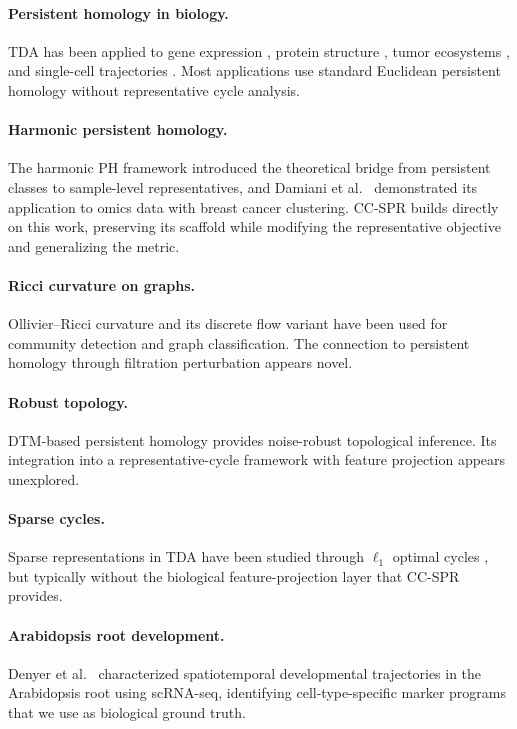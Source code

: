 \documentclass[11pt]{article}
\begin{document}
\paragraph{Persistent homology in biology.}
TDA has been applied to gene expression \cite{rizvi2017}, protein structure \cite{xia2014}, tumor ecosystems \cite{vipond2021}, and single-cell trajectories \cite{moon2019phate}.
Most applications use standard Euclidean persistent homology without representative cycle analysis.

\paragraph{Harmonic persistent homology.}
The harmonic PH framework \cite{harmonicPH} introduced the theoretical bridge from persistent classes to sample-level representatives, and Damiani et al.\ \cite{damiani2024} demonstrated its application to omics data with breast cancer clustering.
CC-SPR builds directly on this work, preserving its scaffold while modifying the representative objective and generalizing the metric.

\paragraph{Ricci curvature on graphs.}
Ollivier--Ricci curvature \cite{ollivier2007, ollivier2009} and its discrete flow variant \cite{ni2019community} have been used for community detection and graph classification.
The connection to persistent homology through filtration perturbation appears novel.

\paragraph{Robust topology.}
DTM-based persistent homology \cite{chazal2011dtm, chazal2017robust} provides noise-robust topological inference.
Its integration into a representative-cycle framework with feature projection appears unexplored.

\paragraph{Sparse cycles.}
Sparse representations in TDA have been studied through $\ell_1$ optimal cycles \cite{chen2011hardness, dey2011optimal}, but typically without the biological feature-projection layer that CC-SPR provides.

\paragraph{Arabidopsis root development.}
Denyer et al.\ \cite{denyer2019} characterized spatiotemporal developmental trajectories in the Arabidopsis root using scRNA-seq, identifying cell-type-specific marker programs that we use as biological ground truth.
\end{document}
